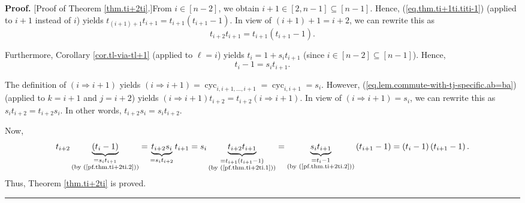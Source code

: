 \documentclass[numbers=enddot,12pt,final,onecolumn,notitlepage]{scrartcl}%
\theoremstyle{definition}
\newenvironment{proof}[1][Proof]{\noindent\textbf{#1.} }{\ \rule{0.5em}{0.5em}}
\begin{document}
\begin{proof}
[Proof of Theorem \ref{thm.ti+2ti}.]From $i\in\left[  n-2\right]  $, we obtain
$i+1\in\left[  2,n-1\right]  \subseteq\left[  n-1\right]  $. Hence,
(\ref{eq.thm.ti+1ti.titi-1}) (applied to $i+1$ instead of $i$) yields
$t_{\left(  i+1\right)  +1}t_{i+1}=t_{i+1}\left(  t_{i+1}-1\right)  $. In view
of $\left(  i+1\right)  +1=i+2$, we can rewrite this as%
\begin{equation}
t_{i+2}t_{i+1}=t_{i+1}\left(  t_{i+1}-1\right)  . \label{pf.thm.ti+2ti.1}%
\end{equation}


Furthermore, Corollary \ref{cor.tl-via-tl+1} (applied to $\ell=i$) yields
$t_{i}=1+s_{i}t_{i+1}$ (since $i\in\left[  n-2\right]  \subseteq\left[
n-1\right]  $). Hence,
\begin{equation}
t_{i}-1=s_{i}t_{i+1}. \label{pf.thm.ti+2ti.2}%
\end{equation}


The definition of $\left(  i\Longrightarrow i+1\right)  $ yields $\left(
i\Longrightarrow i+1\right)  =\operatorname*{cyc}\nolimits_{i,i+1,\ldots
,i+1}=\operatorname*{cyc}\nolimits_{i,i+1}=s_{i}$. However,
(\ref{eq.lem.commute-with-tj-specific.ab=ba}) (applied to $k=i+1$ and $j=i+2$)
yields $\left(  i\Longrightarrow i+1\right)  t_{i+2}=t_{i+2}\left(
i\Longrightarrow i+1\right)  $. In view of $\left(  i\Longrightarrow
i+1\right)  =s_{i}$, we can rewrite this as $s_{i}t_{i+2}=t_{i+2}s_{i}$. In
other words, $t_{i+2}s_{i}=s_{i}t_{i+2}$.

Now,
\[
t_{i+2}\underbrace{\left(  t_{i}-1\right)  }_{\substack{=s_{i}t_{i+1}%
\\\text{(by (\ref{pf.thm.ti+2ti.2}))}}}=\underbrace{t_{i+2}s_{i}}%
_{=s_{i}t_{i+2}}t_{i+1}=s_{i}\underbrace{t_{i+2}t_{i+1}}_{\substack{=t_{i+1}%
\left(  t_{i+1}-1\right)  \\\text{(by (\ref{pf.thm.ti+2ti.1}))}}%
}=\underbrace{s_{i}t_{i+1}}_{\substack{=t_{i}-1\\\text{(by
(\ref{pf.thm.ti+2ti.2}))}}}\left(  t_{i+1}-1\right)  =\left(  t_{i}-1\right)
\left(  t_{i+1}-1\right)  .
\]
Thus, Theorem \ref{thm.ti+2ti} is proved.
\end{proof}
\end{document}
